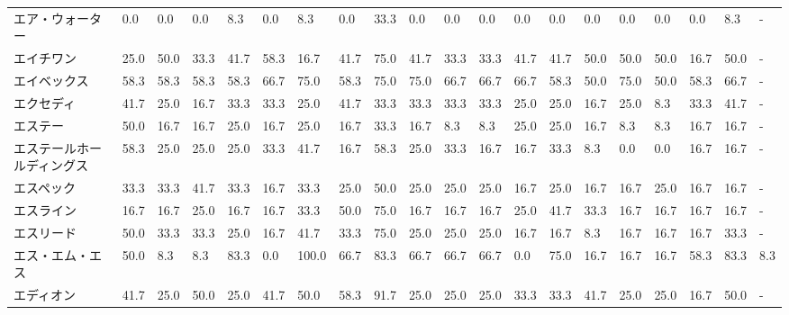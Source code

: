 \begin{tabular}{llllllllllllllllllll}
エア・ウォーター        &    0.0 &    0.0 &       0.0 &       8.3 &        0.0 &    8.3 &    0.0 &   33.3 &     0.0 &     0.0 &    0.0 &   0.0 &    0.0 &     0.0 &     0.0 &   0.0 &   0.0 &   8.3 &     - \\
エイチワン           &   25.0 &   50.0 &      33.3 &      41.7 &       58.3 &   16.7 &   41.7 &   75.0 &    41.7 &    33.3 &   33.3 &  41.7 &   41.7 &    50.0 &    50.0 &  50.0 &  16.7 &  50.0 &     - \\
エイベックス          &   58.3 &   58.3 &      58.3 &      58.3 &       66.7 &   75.0 &   58.3 &   75.0 &    75.0 &    66.7 &   66.7 &  66.7 &   58.3 &    50.0 &    75.0 &  50.0 &  58.3 &  66.7 &     - \\
エクセディ           &   41.7 &   25.0 &      16.7 &      33.3 &       33.3 &   25.0 &   41.7 &   33.3 &    33.3 &    33.3 &   33.3 &  25.0 &   25.0 &    16.7 &    25.0 &   8.3 &  33.3 &  41.7 &     - \\
エステー            &   50.0 &   16.7 &      16.7 &      25.0 &       16.7 &   25.0 &   16.7 &   33.3 &    16.7 &     8.3 &    8.3 &  25.0 &   25.0 &    16.7 &     8.3 &   8.3 &  16.7 &  16.7 &     - \\
エステールホールディングス   &   58.3 &   25.0 &      25.0 &      25.0 &       33.3 &   41.7 &   16.7 &   58.3 &    25.0 &    33.3 &   16.7 &  16.7 &   33.3 &     8.3 &     0.0 &   0.0 &  16.7 &  16.7 &     - \\
エスペック           &   33.3 &   33.3 &      41.7 &      33.3 &       16.7 &   33.3 &   25.0 &   50.0 &    25.0 &    25.0 &   25.0 &  16.7 &   25.0 &    16.7 &    16.7 &  25.0 &  16.7 &  16.7 &     - \\
エスライン           &   16.7 &   16.7 &      25.0 &      16.7 &       16.7 &   33.3 &   50.0 &   75.0 &    16.7 &    16.7 &   16.7 &  25.0 &   41.7 &    33.3 &    16.7 &  16.7 &  16.7 &  16.7 &     - \\
エスリード           &   50.0 &   33.3 &      33.3 &      25.0 &       16.7 &   41.7 &   33.3 &   75.0 &    25.0 &    25.0 &   25.0 &  16.7 &   16.7 &     8.3 &    16.7 &  16.7 &  16.7 &  33.3 &     - \\
エス・エム・エス        &   50.0 &    8.3 &       8.3 &      83.3 &        0.0 &  100.0 &   66.7 &   83.3 &    66.7 &    66.7 &   66.7 &   0.0 &   75.0 &    16.7 &    16.7 &  16.7 &  58.3 &  83.3 &   8.3 \\
エディオン           &   41.7 &   25.0 &      50.0 &      25.0 &       41.7 &   50.0 &   58.3 &   91.7 &    25.0 &    25.0 &   25.0 &  33.3 &   33.3 &    41.7 &    25.0 &  25.0 &  16.7 &  50.0 &     - \\

\end{tabular}
